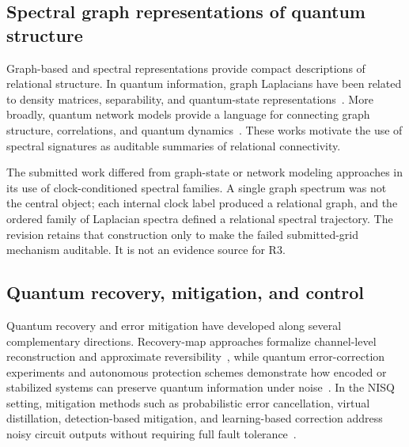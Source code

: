 \documentclass{iopjournal}
\begin{document}
\subsection{Spectral graph representations of quantum structure}

Graph-based and spectral representations provide compact descriptions of relational 
structure. In quantum information, graph Laplacians have been related to density matrices, 
separability, and quantum-state representations~\cite{Braunstein2006GraphLaplacianDensityMatrix,Adhikari2017WeightedDigraphsQuantumStates,Bradshaw2023GraphZetaEntanglement}. 
More broadly, quantum network models provide a language for connecting graph structure, 
correlations, and quantum dynamics~\cite{Biamonte2019ComplexNetworksQuantum}. These works 
motivate the use of spectral signatures as auditable summaries of relational connectivity.

The submitted work differed from graph-state or network modeling approaches in its
use of clock-conditioned spectral families. A single graph spectrum was not the
central object; each internal clock label produced a relational graph, and the
ordered family of Laplacian spectra defined a relational spectral trajectory.
The revision retains that construction only to make the failed submitted-grid
mechanism auditable. It is not an evidence source for R3.

\subsection{Quantum recovery, mitigation, and control}
Quantum recovery and error mitigation have developed along several complementary directions. 
Recovery-map approaches formalize channel-level reconstruction and approximate reversibility~\cite{Lautenbacher2024PetzRecoveryQudit}, 
while quantum error-correction experiments and autonomous protection schemes demonstrate 
how encoded or stabilized systems can preserve quantum information under noise~\cite{Reed2013EntanglementQEC,Gertler2021AutonomousQECBosonic,Nascimento2011NoiselessSubsystem}. In the NISQ setting, mitigation methods such as probabilistic error cancellation, virtual distillation, detection-based mitigation, and learning-based correction address noisy circuit outputs without requiring full fault tolerance~\cite{VanDenBerg2023SparsePauliLindbladPEC,Xu2024CircuitNoiseResilientVirtualDistillation,Zhang2021AutoencoderErrorMitigation,Strikis2021LearningBasedQEM,Liao2024MachineLearningQEM,Liao2025NoiseAgnosticQEM}.
\end{document}
